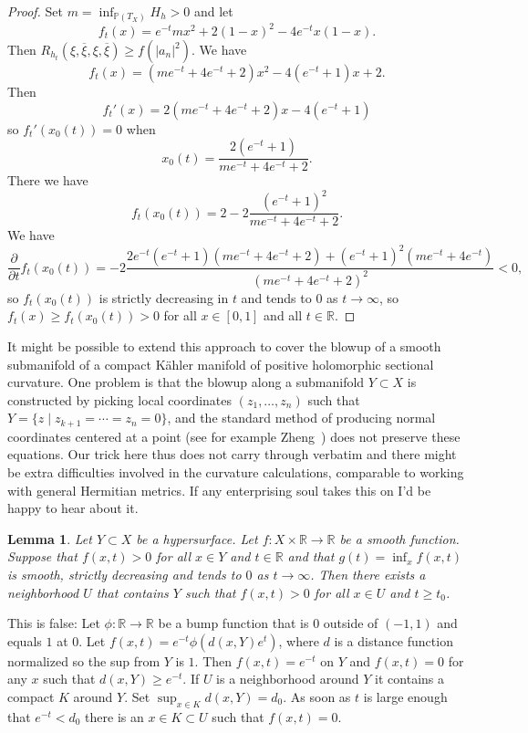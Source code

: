 \documentclass[10pt,a4paper]{amsart}
\newtheorem{lemm}[theo]{Lemma}
\newcommand{\kk}[1]{\mathbb{#1}}
\def\ov#1{\overline{#1}}
\def\hsc{holomorphic sectional curvature}
\begin{document}
\begin{proof}
Set $m = \inf_{\kk P(T_X)} H_h > 0$ and let
$$
f_t(x) = e^{-t} m x^2 + 2(1-x)^2 - 4e^{-t} x(1-x).
$$
Then $R_{h_t}(\xi, \ov\xi, \xi, \ov\xi) \geq f(|a_n|^2)$.
We have
$$
f_t(x)
= (m e^{-t} + 4e^{-t} + 2)x^2 - 4(e^{-t} + 1)x + 2.
$$
Then
$$
f_t'(x)
= 2(m e^{-t} + 4e^{-t} + 2)x - 4(e^{-t} + 1)
$$
so $f_t'(x_0(t)) = 0$ when
$$
x_0(t) = \frac{2(e^{-t} + 1)}{m e^{-t} + 4e^{-t} + 2}.
$$
There we have
$$
f_t(x_0(t))
=
2 - 2 \frac{(e^{-t} + 1)^2}{m e^{-t} + 4e^{-t} + 2}.
$$
We have
$$
\frac{\partial}{\partial t} f_t(x_0(t))
= -2 \frac{2e^{-t}(e^{-t}+1)(m e^{-t} + 4e^{-t} + 2) + (e^{-t}+1)^2(me^{-t}+4e^{-t})}{(m e^{-t} + 4e^{-t} + 2)^2}
< 0,
$$
so $f_t(x_0(t))$ is strictly decreasing in $t$ and tends to $0$ as $t \to
\infty$, so $f_t(x) \geq f_t(x_0(t)) > 0$ for all $x \in [0,1]$ and all $t \in
\kk R$.
\end{proof}



It might be possible to extend this approach to cover the blowup of a smooth
submanifold of a compact K\"ahler manifold of positive \hsc.
One problem
is that the blowup along a submanifold $Y \subset X$ is
constructed by picking local coordinates $(z_1,\ldots,z_n)$ such that $Y = \{z
\mid z_{k+1} = \cdots = z_n = 0\}$,
and the standard method of producing normal coordinates centered at a point
(see for example Zheng~\cite{zheng2000complex})
does not preserve these equations.
Our trick here thus does not carry through verbatim and there might be extra
difficulties involved in the curvature calculations, comparable to working
with general Hermitian metrics.
If any enterprising soul takes this on I'd be happy to hear about it.


\begin{lemm}
Let $Y \subset X$ be a hypersurface.
Let $f : X \times \kk R \to \kk R$ be a smooth function.
Suppose that $f(x,t) > 0$ for all $x \in Y$ and $t \in \kk R$
and that $g(t) = \inf_{x} f(x,t)$ is smooth, strictly decreasing and tends
to $0$ as $t \to \infty$.
Then there exists a neighborhood $U$ that contains $Y$ such that
$f(x,t) > 0$ for all $x \in U$ and $t \geq t_0$.
\end{lemm}

This is false:
Let $\phi : \kk R \to \kk R$ be a bump function that is $0$ outside of $(-1,1)$
and equals $1$ at $0$.
Let $f(x,t) = e^{-t} \phi(d(x, Y) e^t)$, where $d$ is a distance function
normalized so the sup from $Y$ is $1$.
Then $f(x,t) = e^{-t}$ on $Y$ and $f(x,t) = 0$ for any $x$ such that $d(x,Y)
\geq e^{-t}$.
If $U$ is a neighborhood around $Y$ it contains a compact $K$ around $Y$.
Set $\sup_{x \in K} d(x,Y) = d_0$.
As soon as $t$ is large enough that $e^{-t} < d_0$ there is an $x \in K \subset
U$ such that $f(x, t) = 0$.




\end{document}
